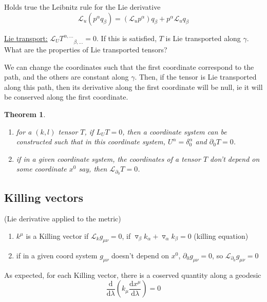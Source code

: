 \documentclass[a4paper]{book}
\newtheorem{theorem}{Theorem}[section]
\theoremstyle{definition}
\theoremstyle{remark}
\begin{document}
Holds true the Leibnitz rule for the Lie derivative
\begin{equation}
    \mathcal{L}_u(p^\alpha q_\beta) = (\mathcal{L}_u p^\alpha)q_\beta + p^\alpha \mathcal{L}_u  q_\beta
\end{equation}

\underline{Lie transport:} $\mathcal{L}_U T^{\alpha, \dots}_{\qquad \beta, \dots} = 0$. If this is satisfied, $T$ is Lie transported along $\gamma$. What are the properties of Lie transported tensors? \par \medskip 

We can change the coordinates such that the first coordinate correspond to the path, and the others are constant along $\gamma$. Then, if the tensor is Lie transported along this path, then its derivative along the first coordinate will be null, ie it will be conserved along the first coordinate. 

\begin{theorem}
    \begin{enumerate}
        \item for a $(k, l)$ tensor $T$, if $L_U T = 0$, then a coordinate system can be constructed such that in this coordinate system, $U^\alpha = \delta^\alpha_0$ and $\partial_0 T= 0$.
        \item if in a given coordinate system, the coordinates of a tensor $T$ don't depend on some coordinate $x^0$ say, then $\mathcal{L}_{\partial_0} T= 0$.  
    \end{enumerate}
\end{theorem}

\subsection{Killing vectors} (Lie derivative applied to the metric)
\begin{enumerate}
    \item $k^\mu$ is a Killing vector if $\mathcal{L}_k g_{\mu\nu} = 0$, if $\triangledown _\beta k_\alpha + \triangledown _\alpha k_\beta = 0$ (killing equation)
    \item if in a given coord system $g_{\mu\nu}$ doesn't depend on $x^0$, $\partial_0 g_{\mu\nu} = 0$, so $\mathcal{L}_{\partial_0}g_{\mu\nu} = 0$
\end{enumerate}
As expected, for each Killing vector, there is a coserved quantity along a geodesic 
\begin{equation}
    \frac{\text{d}}{\text{d}\lambda}\left(k_\mu \frac{\text{d}x^\mu}{\text{d}\lambda}\right) = 0
\end{equation}
\end{document}
